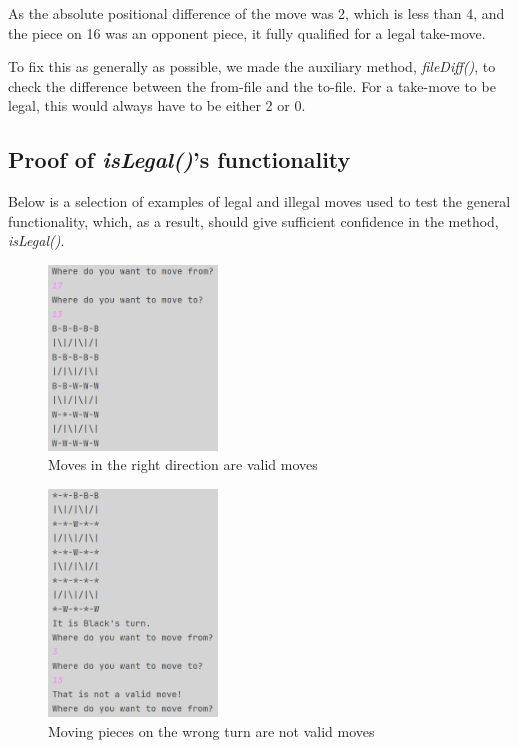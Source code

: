 \documentclass[12pt, a4paper]{article}
\begin{document}
As the absolute positional difference of the move was 2, which is less than 4, and the piece on 16 was an opponent piece, it fully qualified for a legal take-move. \par To fix this as generally as possible, we made the auxiliary method, \emph{fileDiff()}, to check the difference between the from-file and the to-file. For a take-move to be legal, this would always have to be either 2 or 0. \par

\subsection{Proof of \emph{isLegal()}’s functionality}
Below is a selection of examples of legal and illegal moves used to test the general functionality, which, as a result, should give sufficient confidence in the method, \emph{isLegal()}.

\begin{figure}[h]
	\centering
	\caption*{Moves in the right direction are valid moves}
	\includegraphics[width=0.4\textwidth]{isLegalProf/LovligeTrækOgTakeMoves/DuMåGodLaveLovligeTræk.png}	
\end{figure}

\begin{figure}[h]
	\centering
	\caption*{Moving pieces on the wrong turn are not valid moves}
	\includegraphics[width=0.4\textwidth]{isLegalProf/MåIkkeRykkeTilFelterDerStårEnBrik.png}	
\end{figure}
\end{document}
